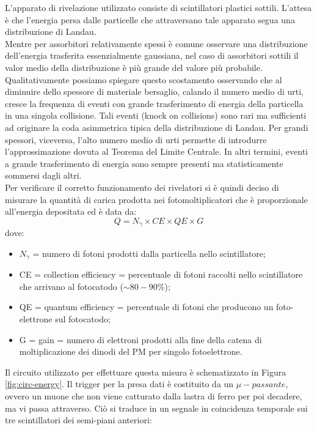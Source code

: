 L'apparato di rivelazione utilizzato consiste di scintillatori plastici sottili. L'attesa \`e che l'energia persa dalle particelle che attraversano tale apparato segua una distribuzione di Landau.\\
Mentre per assorbitori relativamente spessi \`e comune osservare una distribuzione dell'energia trasferita essenzialmente gaussiana, nel caso di assorbitori sottili il valor medio della distribuzione \`e pi\`u grande del valore pi\`u probabile. Qualitativamente possiamo spiegare questo
scostamento osservando che al diminuire dello spessore di materiale bersaglio, calando il numero medio di urti, cresce la frequenza di eventi con grande trasferimento di energia della particella in una singola collisione. Tali eventi (knock on collisions) sono rari ma sufficienti ad
originare la coda asimmetrica tipica della distribuzione di Landau.
Per grandi spessori, viceversa, l'alto numero medio di urti permette di introdurre l'approssimazione dovuta al Teorema del Limite Centrale. In altri termini, eventi a grande trasferimento di energia sono sempre presenti ma statisticamente sommersi dagli altri.\\
Per verificare il corretto funzionamento dei rivelatori si \`e quindi deciso di misurare la quantit\`a di carica prodotta nei fotomoltiplicatori che \`e proporzionale all'energia depositata ed \`e data da:
\begin{equation}
Q=N_{\gamma}\times CE \times QE \times G
\end{equation}
dove:
\begin{itemize}
	\item $N_{\gamma}$ = numero di fotoni prodotti dalla particella nello scintillatore;
	\item CE = collection efficiency = percentuale di fotoni raccolti nello scintillatore che arrivano al fotocatodo ($\sim 80-90 \%$);
	\item QE = quantum efficiency = percentuale di fotoni che producono un foto-elettrone sul fotocatodo;
  \item G = gain = numero di elettroni prodotti alla fine della catena di moltiplicazione dei dinodi del PM per singolo fotoelettrone.
\end{itemize}
Il circuito utilizzato per effettuare questa misura \`e schematizzato in Figura \ref{fig:circ-energy}. Il trigger per la presa dati \`e costituito da un $\mu-passante$, ovvero un muone che non viene catturato dalla lastra di ferro per poi decadere, ma vi passa attraverso. Ci\`o si traduce in un segnale in coincidenza temporale sui tre scintillatori dei semi-piani anteriori:
